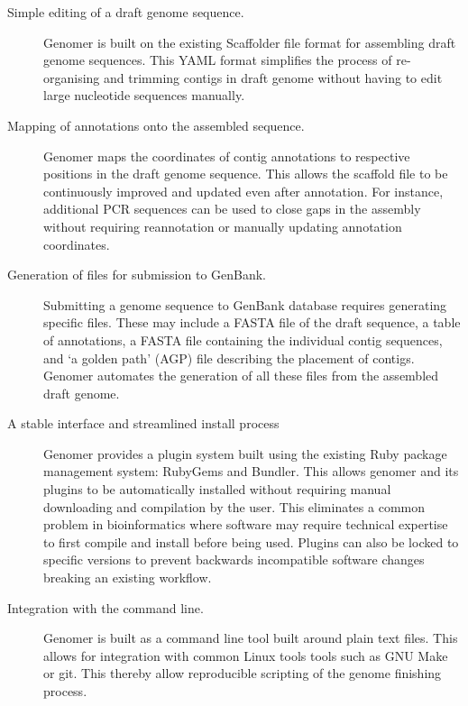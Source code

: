\documentclass[10pt]{article}
\begin{document}
\begin{description} 

  \item[Simple editing of a draft genome sequence.]{Genomer is built on the
  existing Scaffolder \cite{barton2012} file format for assembling draft genome
  sequences. This YAML \cite{yaml} format simplifies the process of
  re-organising and trimming contigs in draft genome without having to edit
  large nucleotide sequences manually.}

  \item[Mapping of annotations onto the assembled sequence.]{Genomer maps the
  coordinates of contig annotations to respective positions in the draft genome
  sequence. This allows the scaffold file to be continuously improved and
  updated even after annotation. For instance, additional PCR sequences can be
  used to close gaps in the assembly without requiring reannotation or manually
  updating annotation coordinates.}

  \item[Generation of files for submission to GenBank.]{Submitting a genome
  sequence to GenBank database requires generating specific files. These may
  include a FASTA file of the draft sequence, a table of annotations, a FASTA
  file containing the individual contig sequences, and `a golden path' (AGP)
  \cite{agp-spec} file describing the placement of contigs. Genomer automates
  the generation of all these files from the assembled draft genome.}

  \item[A stable interface and streamlined install process]{Genomer provides a
  plugin system built using the existing Ruby package management system:
  RubyGems and Bundler. This allows genomer and its plugins to be automatically
  installed without requiring manual downloading and compilation by the user.
  This eliminates a common problem in bioinformatics where software may require
  technical expertise to first compile and install before being used. Plugins
  can also be locked to specific versions to prevent backwards incompatible
  software changes breaking an existing workflow.}

  \item[Integration with the command line.]{Genomer is built as a command line
  tool built around plain text files. This allows for integration with common
  Linux tools tools such as GNU Make or git. This thereby allow reproducible
  scripting of the genome finishing process.}

\end{description}
\end{document}
